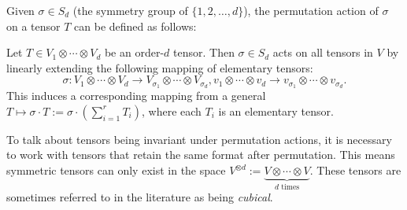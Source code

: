 \documentclass[../Lael_John_MasterThesis_Draft.tex]{subfiles}
\begin{document}
Given $\sigma \in S_d$ (the symmetry group of $\{1, 2, \ldots , d\}$), the permutation action of $\sigma$ on a tensor $T$ can be defined as follows:
\begin{definition}\label{defn:tensorpermutation}
    Let $T \in V_1 \otimes \cdots \otimes V_d$ be an order-$d$ tensor. Then $\sigma \in S_d$ acts on all tensors in $V$ by linearly extending the following mapping of elementary tensors:
    $$\sigma: V_1 \otimes \cdots \otimes V_d \to V_{\sigma_1} \otimes \cdots \otimes V_{\sigma_d}, v_1 \otimes \cdots \otimes v_d \to v_{\sigma_1} \otimes \cdots \otimes v_{\sigma_d}.$$ This induces a corresponding mapping from a general $T \mapsto \sigma \cdot T := \sigma \cdot \left( \sum_{i=1}^{r} T_i\right)$, where each $T_i$ is an elementary tensor.
\end{definition}
To talk about tensors being invariant under permutation actions, it is necessary to work with tensors that retain the same format after permutation. This means symmetric tensors can only exist in the space $V^{\otimes d}:= \underbrace{V \otimes \cdots \otimes V}_{\text{$d$ times}}$. These tensors are sometimes referred to in the literature as being \textit{cubical}.
\end{document}
